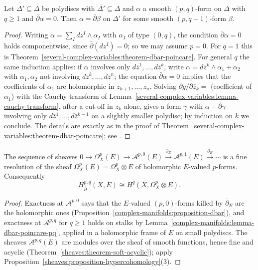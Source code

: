 \begin{lemma}\label{complex-manifolds:lemma-dbar-poincare-pq}
Let $\Delta' \subseteq \Delta$ be polydiscs with $\overline{\Delta'} \subseteq \Delta$ and $\alpha$ a smooth $(p,q)$-form on $\Delta$ with $q \geq 1$ and $\bar\partial\alpha = 0$. Then $\alpha = \bar\partial\beta$ on $\Delta'$ for some
smooth $(p, q-1)$-form $\beta$.
\end{lemma}

\begin{proof}
Writing $\alpha = \sum_I dz^I \wedge \alpha_I$ with $\alpha_I$ of type $(0,q)$, the condition $\bar\partial\alpha = 0$ holds componentwise, since $\bar\partial(dz^I) = 0$; so we may assume $p = 0$. For $q = 1$ this is
Theorem~\ref{several-complex-variables:theorem-dbar-poincare}. For general $q$ the same induction applies: if $\alpha$ involves only $d\bar z^1, \ldots, d\bar z^k$, write
$\alpha = d\bar z^k \wedge \alpha_1 + \alpha_2$ with $\alpha_1, \alpha_2$ not involving $d\bar z^k, \ldots, d\bar z^n$; the equation $\bar\partial\alpha = 0$ implies that the coefficients of $\alpha_1$ are holomorphic in
$z_{k+1}, \ldots, z_n$. Solving $\partial g/\partial\bar z_k = $ (coefficient of $\alpha_1$) with the Cauchy transform of Lemma~\ref{several-complex-variables:lemma-cauchy-transform}, after a cut-off in $z_k$
alone, gives a form $\gamma$ with $\alpha - \bar\partial\gamma$ involving only $d\bar z^1, \ldots, d\bar z^{k-1}$ on a slightly smaller polydisc; by induction on $k$ we conclude. The details are exactly as in the proof of
Theorem~\ref{several-complex-variables:theorem-dbar-poincare}; see \cite[Chapter 0, Section 2]{griffiths-harris}.
\end{proof}

\begin{theorem}[Dolbeault]\label{complex-manifolds:theorem-dolbeault}
The sequence of sheaves $0 \to \Omega^p_X(E) \to \mathcal{A}^{p,0}(E) \xrightarrow{\bar\partial_E} \mathcal{A}^{p,1}(E) \xrightarrow{\bar\partial_E} \cdots$ is a fine resolution of the sheaf
$\Omega^p_X(E) = \Omega^p_X \otimes E$ of holomorphic $E$-valued $p$-forms. Consequently
\[
H^{p,q}_{\bar\partial}(X, E) \cong H^q(X, \Omega^p_X \otimes E).
\]
\end{theorem}

\begin{proof}
Exactness at $\mathcal{A}^{p,0}$ says that the $E$-valued $(p,0)$-forms killed by $\bar\partial_E$ are the holomorphic ones (Proposition~\ref{complex-manifolds:proposition-dbar}), and exactness at
$\mathcal{A}^{p,q}$ for $q \geq 1$ holds on stalks by Lemma~\ref{complex-manifolds:lemma-dbar-poincare-pq}, applied in a holomorphic frame of $E$ on small polydiscs. The sheaves $\mathcal{A}^{p,q}(E)$ are modules over the
sheaf of smooth functions, hence fine and acyclic (Theorem~\ref{sheaves:theorem-soft-acyclic}); apply Proposition~\ref{sheaves:proposition-hypercohomology}(3).
\end{proof}

